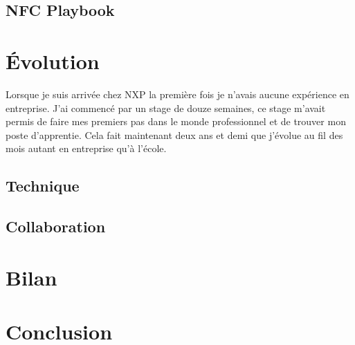 \documentclass[french,12pt,a4paper,titlepage,openright,openbib]{report}
\begin{document}
\section{NFC Playbook}
\lipsum[4-5]
\chapter{Évolution}
Lorsque je suis arrivée chez NXP la première fois je n'avais aucune expérience en entreprise. J'ai commencé par un stage de douze semaines, ce stage m'avait permis de faire mes premiers pas dans le monde professionnel et de trouver mon poste d'apprentie.
Cela fait maintenant deux ans et demi que j'évolue au fil des mois autant en entreprise qu'à l'école.
\section{Technique}
\lipsum[1-1]
\section{Collaboration}
\lipsum[1-1]
\chapter{Bilan}
\lipsum[6-7]
\chapter{Conclusion}
\lipsum[8-9]

\printglossary[title={Glossaire}]
\end{document}
